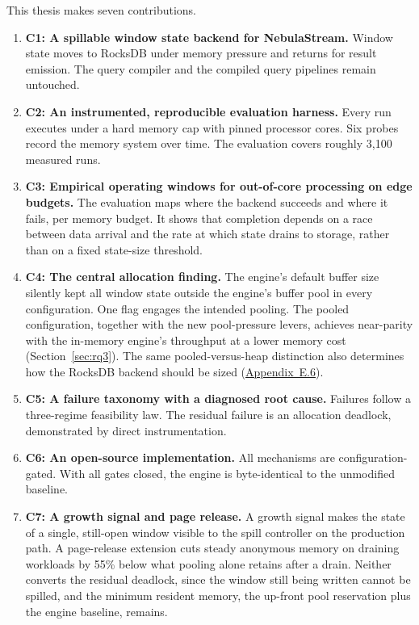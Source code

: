This thesis makes seven contributions.
\begin{enumerate}
  \item \textbf{C1: A spillable window state backend for NebulaStream.}
    Window state moves to RocksDB under memory pressure and returns for result emission.
    The query compiler and the compiled query pipelines remain untouched.
  \item \textbf{C2: An instrumented, reproducible evaluation harness.}
    Every run executes under a hard memory cap with pinned processor cores.
    Six probes record the memory system over time.
    The evaluation covers roughly 3{,}100 measured runs.
  \item \textbf{C3: Empirical operating windows for out-of-core processing on edge budgets.}
    The evaluation maps where the backend succeeds and where it fails, per memory budget.
    It shows that completion depends on a race between data arrival and the rate at which state drains to storage, rather than on a fixed state-size threshold.
  \item \textbf{C4: The central allocation finding.}
    The engine's default buffer size silently kept all window state outside the engine's buffer pool in every configuration.
    One flag engages the intended pooling.
    The pooled configuration, together with the new pool-pressure levers, achieves near-parity with the in-memory engine's throughput at a lower memory cost (Section~\ref{sec:rq3}).
    The same pooled-versus-heap distinction also determines how the RocksDB backend should be sized (\hyperref[app:rb32]{Appendix~E.6}).
  \item \textbf{C5: A failure taxonomy with a diagnosed root cause.}
    Failures follow a three-regime feasibility law.
    The residual failure is an allocation deadlock, demonstrated by direct instrumentation.
  \item \textbf{C6: An open-source implementation.}
    All mechanisms are configuration-gated.
    With all gates closed, the engine is byte-identical to the unmodified baseline.
  \item \textbf{C7: A growth signal and page release.}
    A growth signal makes the state of a single, still-open window visible to the spill controller on the production path.
    A page-release extension cuts steady anonymous memory on draining workloads by 55\% below what pooling alone retains after a drain.
    Neither converts the residual deadlock, since the window still being written cannot be spilled, and the minimum resident memory, the up-front pool reservation plus the engine baseline, remains.
\end{enumerate}


